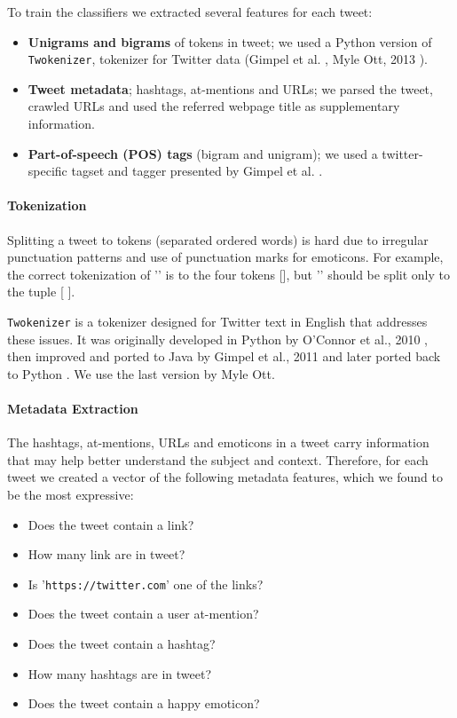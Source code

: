 \documentclass[letterpaper,twocolumn,10pt]{article}
\begin{document}
To train the classifiers we extracted several features for each tweet:

\begin{itemize}[noitemsep]
	\item \textbf{Unigrams and bigrams} of tokens in tweet; we used a Python version of \texttt{Twokenizer}, tokenizer for Twitter data (Gimpel et al. \cite{POS-Tagging}, Myle Ott, 2013 \cite{ark-twokenize-py}).
	\item \textbf{Tweet metadata}; hashtags, at-mentions and URLs; we parsed the tweet, crawled URLs and used the referred webpage title as supplementary information.
	\item \textbf{Part-of-speech (POS) tags} (bigram and unigram); we used a twitter-specific tagset and tagger presented by Gimpel et al. \cite{POS-Tagging}.
\end{itemize}

\paragraph{Tokenization}
Splitting a tweet to tokens (separated ordered words) is hard due to irregular punctuation patterns and use of punctuation marks for emoticons. For example, the correct tokenization of '' is to the four tokens [], but '' should be split only to the tuple [  ].

\texttt{Twokenizer} is a tokenizer designed for Twitter text in English that addresses these issues. It was originally developed in Python by O'Connor et al., 2010 \cite{TweetMotif}, then improved and ported to Java by Gimpel et al., 2011 \cite{POS-Tagging} and later ported back to Python \cite{ark-twokenize-py}. We use the last version by Myle Ott.

\paragraph{Metadata Extraction}
The hashtags, at-mentions, URLs and emoticons in a tweet carry information that may help better understand the subject and context. Therefore, for each tweet we created a vector of the following metadata features, which we found to be the most expressive:

\begin{itemize}[noitemsep, nolistsep]
	\item Does the tweet contain a link?
	\item How many link are in tweet?
	\item Is '\texttt{https://twitter.com}' one of the links?
	\item Does the tweet contain a user at-mention?
	\item Does the tweet contain a hashtag?
	\item How many hashtags are in tweet?
	\item Does the tweet contain a happy emoticon?
\end{itemize}
\end{document}
